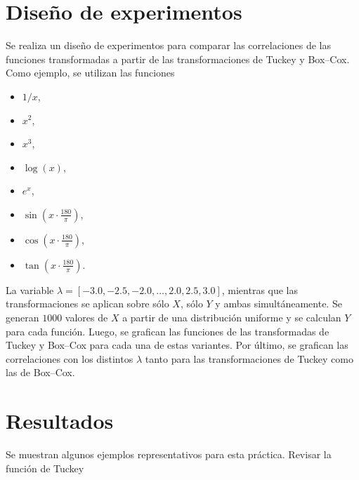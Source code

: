 \documentclass[paper=leter, fontsize=11pt]{scrartcl}
\numberwithin{equation}{section}		%
\numberwithin{figure}{section}			%
\numberwithin{table}{section}				%
\begin{document}
\section{Diseño de experimentos}
Se realiza un diseño de experimentos para comparar las correlaciones de las funciones transformadas a partir de las transformaciones de Tuckey y Box--Cox. Como ejemplo, se utilizan las funciones
\begin{itemize}
    \item $1 / x$,
    \item $x ^ 2$,
    \item $x ^ 3$,
    \item $\log (x)$,
    \item $e ^ x$,
    \item $\sin(x \cdot \frac{180}{\pi})$,
    \item $\cos(x \cdot \frac{180}{\pi})$,
    \item $\tan(x \cdot \frac{180}{\pi})$.
\end{itemize}

La variable  $\lambda = [-3.0, -2.5, -2.0, \ldots, 2.0, 2.5, 3.0 ]$, mientras que las transformaciones se aplican sobre sólo $X$, sólo $Y$ y ambas simultáneamente. Se generan $1000$ valores de $X$ a partir de una distribución uniforme y se calculan $Y$ para cada función. Luego, se grafican las funciones de las transformadas de Tuckey y Box--Cox para cada una de estas variantes. Por último, se grafican las correlaciones con los distintos $\lambda$ tanto para las transformaciones de Tuckey como las de Box--Cox.

\section{Resultados}
Se muestran algunos ejemplos representativos para esta práctica. Revisar la función de Tuckey



\end{document}
